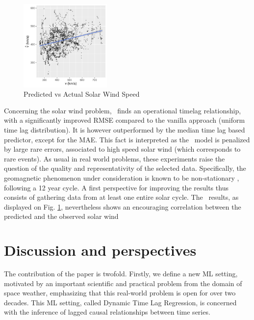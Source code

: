 \begin{figure}
  \centering
  \includegraphics[width=0.4\textwidth]{figures/test_scatter_v}
  \caption{Predicted vs Actual Solar Wind Speed} 
  \label{fig:sw_preds}
\end{figure}

Concerning the solar wind problem, \XX\ finds an operational timelag relationship, with a significantly improved RMSE compared to the vanilla approach (uniform time lag distribution). It is however outperformed by the median time lag based predictor, except for the MAE. This fact is interpreted as the \XX\ model is penalized 
by large rare errors, associated to high speed solar wind (which corresponds to rare events). As usual in real world problems, these experiments raise the question of the quality and representativity of the selected data. Specifically, the geomagnetic phenomenon under consideration is known to be non-stationary \citep{nonstationarysolarwind}, following a 12 year cycle. A first perspective for improving the results thus consists of gathering data from at least one entire solar cycle. 
The \XX\ results, as displayed on Fig. \ref{fig:sw_preds}, nevertheless shows an encouraging correlation between the predicted and the observed solar wind


\section{Discussion and perspectives}
The contribution of the paper is twofold. Firstly, we define a new ML setting, motivated by an important scientific and practical problem from the domain of space weather, emphasizing that this real-world problem is open for over two decades. This ML setting, called Dynamic Time Lag Regression, is concerned with the inference of lagged causal relationships between time series. 

